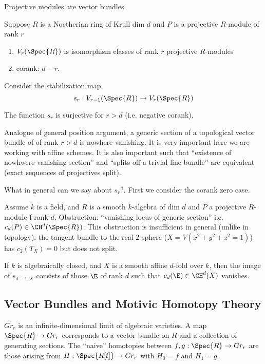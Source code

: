 \documentclass{article}
\begin{document}
Projective modules are vector bundles. 

\begin{defn}
Suppose $R$ is a Noetherian ring of Krull dim $d$ and $P$ is a projective $R$-module of rank $r$
\begin{enumerate}
\item $V_r(\Spec{R})$ is isomorphism classes of rank $r$ projective $R$-modules 
\item corank: $d - r$.
\end{enumerate}
Consider the stabilization map
\[ s_r : V_{r-1}(\Spec{R}) \to V_r(\Spec{R}) \]
\end{defn}

\begin{theorem}
The function $s_r$ is surjective for $r > d$ (i.e. negative corank). 
\end{theorem}

\begin{rmk}
Analogue of general position argument, a generic section of a topological vector bundle of of rank $r > d$ is nowhere vanishing. It is very important here we are working with affine schemes. It is also important such that ``existence of nowhwere vanishing section'' and ``splits off a trivial line bundle'' are equivalent (exact sequences of projectives split). 
\end{rmk}

What in general can we say about $s_r?$. First we consider the corank zero case.

Assume $k$ is a field, and $R$ is a smooth $k$-algebra of dim $d$ and $P$ a projective $R$-module f rank $d$. Obstruction: ``vanishing locus of generic section'' i.e. $c_d(P) \in \CH^d(\Spec{R})$. This obstruction is insufficient in general (unlike in topology): the tangent bundle to the real $2$-sphere ($X = V(x^2 + y^2 + z^2 = 1)$) has $c_2(T_X) = 0$ but does not split. 

\begin{theorem}
If $k$ is algebraically closed, and $X$ is a smooth affine $d$-fold over $k$, then the image of $s_{d-1, X}$ consists of those $\E$ of rank $d$ such that $c_d(\E) \in \CH^d(X)$ vanishes.
\end{theorem}

\subsection{Vector Bundles and Motivic Homotopy Theory}

$Gr_r$ is an infinite-dimensional limit of algebraic varieties. A map $\Spec{R} \to Gr_r$ corresponds to a vector bundle on $R$ and a collection of generating sections. The ``naive'' homotopies between $f,g : \Spec{R} \to Gr_r$ are those arising from $H : \Spec{R[t]} \to Gr_r$ with $H_0 = f$ and $H_1 = g$.
\end{document}

